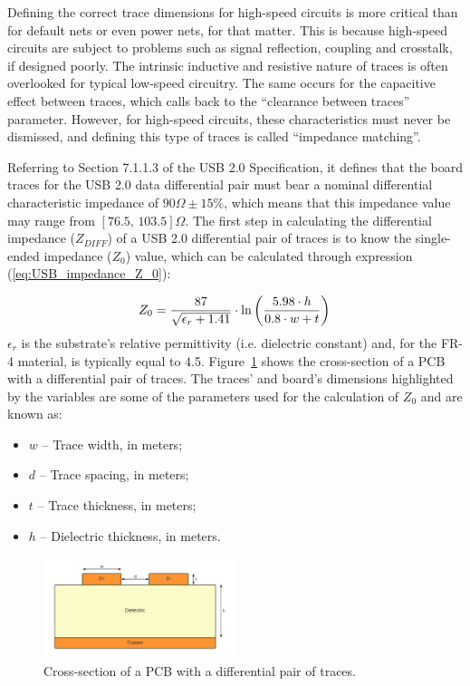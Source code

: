 Defining the correct trace dimensions for high-speed circuits is more critical than for default nets or even power nets, for that matter. This is because high-speed circuits are subject to problems such as signal reflection, coupling and crosstalk, if designed poorly. The intrinsic inductive and resistive nature of traces is often overlooked for typical low-speed circuitry. The same occurs for the capacitive effect between traces, which calls back to the ``clearance between traces'' parameter. However, for high-speed circuits, these characteristics must never be dismissed, and defining this type of traces is called ``impedance matching''.

Referring to Section 7.1.1.3 of the USB 2.0 Specification, it defines that the board traces for the USB 2.0 data differential pair must bear a nominal differential characteristic impedance of $90 \Omega \pm 15\%$, which means that this impedance value may range from $[76.5,\, 103.5]\Omega$. The first step in calculating the differential impedance ($Z_{DIFF}$) of a USB 2.0 differential pair of traces is to know the single-ended impedance ($Z_0$) value, which can be calculated through expression (\ref{eq:USB_impedance_Z_0}):

\begin{equation}\label{eq:USB_impedance_Z_0}
	Z_0 = \frac{87}{\sqrt{\epsilon_r + 1.41}} \cdot \ln \left(\frac{5.98 \cdot h}{0.8 \cdot w + t}\right)\,\medskip
\end{equation}
$\epsilon_r$ is the substrate's relative permittivity (i.e. dielectric constant) and, for the FR-4 material, is typically equal to 4.5.
Figure~\ref{fig:USB_differential_pair} shows the cross-section of a PCB with a differential pair of traces. The traces' and board's dimensions highlighted by the variables are some of the parameters used for the calculation of $Z_0$ and are known as:
\begin{itemize}
	\item $w$ -- Trace width, in meters;
	
	\item $d$ -- Trace spacing, in meters;
	
	\item $t$ -- Trace thickness, in meters;
	
	\item $h$ -- Dielectric thickness, in meters.
\end{itemize}

\begin{figure}[h]
    \centering
    \includegraphics[width=0.5\textwidth]{Chapters/Figures/chapter5/USB_differential_pair.pdf}
    \caption{Cross-section of a PCB with a differential pair of traces.}
    \label{fig:USB_differential_pair}
\end{figure}


